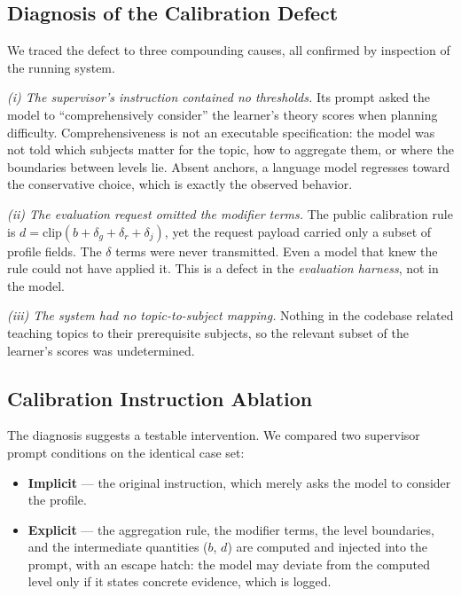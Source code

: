 \subsection{Diagnosis of the Calibration Defect}

We traced the defect to three compounding causes, all confirmed by
inspection of the running system.

\emph{(i) The supervisor's instruction contained no thresholds.} Its prompt
asked the model to ``comprehensively consider'' the learner's theory scores
when planning difficulty. Comprehensiveness is not an executable
specification: the model was not told which subjects matter for the topic, how
to aggregate them, or where the boundaries between levels lie. Absent
anchors, a language model regresses toward the conservative choice, which is
exactly the observed behavior.

\emph{(ii) The evaluation request omitted the modifier terms.} The public
calibration rule is
$d = \mathrm{clip}(b + \delta_g + \delta_r + \delta_j)$, yet the request
payload carried only a subset of profile fields. The $\delta$ terms were never
transmitted. Even a model that knew the rule could not have applied it. This
is a defect in the \emph{evaluation harness}, not in the model.

\emph{(iii) The system had no topic-to-subject mapping.} Nothing in the
codebase related teaching topics to their prerequisite subjects, so the
relevant subset of the learner's scores was undetermined.

\subsection{Calibration Instruction Ablation}
\label{ssec:calib_ablation}

The diagnosis suggests a testable intervention. We compared two supervisor
prompt conditions on the identical case set:

\begin{itemize}
\item[(a)] \textbf{Implicit} --- the original instruction, which merely asks
the model to consider the profile.
\item[(b)] \textbf{Explicit} --- the aggregation rule, the modifier terms, the
level boundaries, and the intermediate quantities ($b$, $d$) are computed and
injected into the prompt, with an escape hatch: the model may deviate from the
computed level only if it states concrete evidence, which is logged.
\end{itemize}

